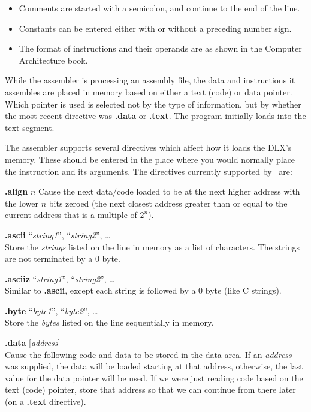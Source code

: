 \begin{mylist}
\begin{itemize}
\item Comments are started with a semicolon, and continue to the end of the line.

\item Constants can be entered either with or without a preceding number sign.

\item The format of instructions and their operands are as shown in
the Computer Architecture book.
\end{itemize}

While the assembler is processing an assembly file, the data and
instructions it assembles are placed in memory based on either a text
(code) or data pointer.  Which pointer is used is selected not by the
type of information, but by whether the most recent directive was {\bf
.data} or {\bf .text}.  The program initially loads into the text
segment.

The assembler supports several directives which affect how it loads
the DLX's memory.  These should be entered in the place where you
would normally place the instruction and its arguments.  The
directives currently supported by \dlxsim\ are:

\begin{mylist}
\item[{\bf .align} $n$ \hfill]
Cause the next data/code loaded to be at the next higher address with
the lower $n$ bits zeroed (the next closest address greater than or
equal to the current address that is a multiple of $2^n$).

\item[{\bf .ascii} ``{\em string1}'', ``{\em string2}'', \ldots]
\nopagebreak \hfill \\
Store the {\em strings} listed on the line in memory as a list of
characters.  The strings are not terminated by a 0 byte.

\item[{\bf .asciiz} ``{\em string1}'', ``{\em string2}'', \ldots]
\nopagebreak \hfill \\
Similar to {\bf .ascii}, except each string is followed by a 0 byte
(like C strings).

\item[{\bf .byte} ``{\em byte1}'', ``{\em byte2}'', \ldots]
\nopagebreak \hfill \\
Store the {\em bytes} listed on the line sequentially in memory.

\item[{\bf .data} {[}{\em address}{]}]
\nopagebreak \hfill \\
Cause the following code and data to be stored in the data area.  If
an {\em address} was supplied, the data will be loaded starting at
that address, otherwise, the last value for the data pointer will be
used.  If we were just reading code based on the text (code) pointer,
store that address so that we can continue from there later (on a {\bf
.text} directive).


\end{mylist}
\end{mylist}

